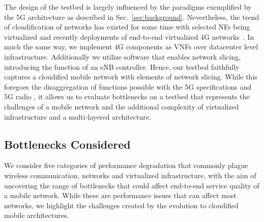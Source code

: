 \documentclass[journal,comsoc]{IEEEtran}
\begin{document}
The design of the testbed is largely influenced by the paradigms exemplified by the 5G architecture as described in Sec.~\ref{sec:background}.
Nevertheless, the trend of cloudification of networks has existed for some time with selected NFs being virtualized and recently deployments of end-to-end virtualized 4G networks~\cite{4grakuten, 4gtmobile}.
In much the same way, we implement 4G components as VNFs over datacenter level infrastructure. Additionally we utilize software that enables network slicing, introducing the function of an eNB controller.
Hence, our testbed faithfully captures a cloudified mobile network with elements of network slicing.
While this foregoes the disaggregation of functions possible with the 5G specifications and 5G radio \cite{3gpp_release15}, it allows us to evaluate bottlenecks on a testbed that represents the challenges of a mobile network and the additional complexity of virtualized infrastructure and a multi-layered architecture.

% 
\subsection{Bottlenecks Considered}
\label{sec:methodology_bottlenecks}

% 
We consider five categories of performance degradation that commonly plague wireless communication, networks and virtualized infrastructure, with the aim of uncovering the range of bottlenecks that could affect end-to-end service quality of a mobile network. While these are performance issues that can affect most networks, we highlight the challenges created by the evolution to cloudified mobile architectures.
\end{document}
